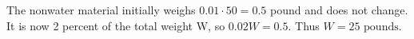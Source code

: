 The nonwater material initially weighs $0.01\cdot 50=0.5$ pound and does not change. It is now 2 percent of the total weight W, so $0.02 W=0.5$. Thus $\boxed{W=25\text{ pounds}}$.
